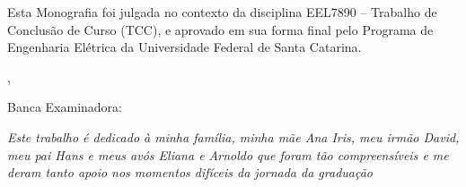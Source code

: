 \documentclass[a5paper]{ufsc-thesis}
\begin{document}
\begin{folhadeaprovacao}

  \begin{center}
    {\imprimirautor}

    \vspace*{\fill}\vspace*{\fill}
    \begin{center}
      \ABNTEXchapterfont\bfseries\Large\imprimirtitulo
    \end{center}
    \vspace*{\fill}
    
    
    	\begin{center}
    		\vspace*{0.5cm}
    		Esta Monografia foi julgada no contexto da disciplina EEL7890 -- Trabalho de Conclusão de Curso (TCC), e aprovado em sua forma final pelo Programa de Engenharia Elétrica da Universidade Federal de Santa Catarina.
    		\vspace*{0.5cm}
  		\end{center}
    
    \vspace*{\fill}
   \end{center}
  
  \begin{center}
    {\large\imprimirlocal},
    {\large\imprimirdata}
  \end{center}
        
   Banca Examinadora:
      

\end{folhadeaprovacao}

\begin{dedicatoria}
   \vspace*{\fill}
   \centering
   \noindent
   \textit{Este trabalho é dedicado à minha família, minha mãe Ana Iris, meu irmão David, meu pai Hans e meus avós Eliana e Arnoldo que foram tão compreensíveis e me deram tanto apoio nos momentos difíceis da jornada da graduação} \vspace*{\fill}
\end{dedicatoria}
\end{document}
